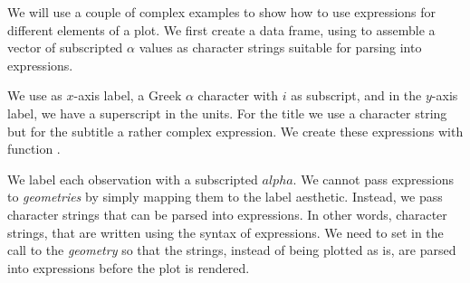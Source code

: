 \documentclass[krantz2]{krantz}\usepackage{knitr}
\begin{document}
We will use a couple of complex examples to show how to use expressions for different elements of a plot.
We first create a data frame, using  to assemble a vector of subscripted $\alpha$ values as character strings suitable for parsing into expressions.

\begin{knitrout}\footnotesize
{}\color{fgcolor}\begin{kframe}
\begin{alltt}
\hlstd{(}\hlstd{)} 
 \hlkwb{<-}
  \hlstd{(} \hlstd{=} \hlopt{:}\hlstd{,}
              \hlstd{=} \hlstd{(}\hlstd{),}
              \hlstd{=} \hlstd{(}\hlstr{"alpha["}\hlstd{,} \hlopt{:}\hlstd{,} \hlstr{"]"}\hlstd{,}  \hlstd{=} \hlstd{))}
\end{alltt}
\end{kframe}
\end{knitrout}

We use as $x$-axis label, a Greek $\alpha$ character with $i$ as subscript, and in the $y$-axis label, we have a superscript in the units. For the title we use a character string but for the subtitle a rather complex expression. We create these expressions with function .

We label each observation with a subscripted $alpha$. We cannot pass expressions to \emph{geometries} by simply mapping them to the label aesthetic. Instead, we pass character strings that can be parsed into expressions. In other words, character strings, that are written using the syntax of expressions. We need to set  in the call to the \emph{geometry} so that the strings, instead of being plotted as is, are parsed into expressions before the plot is rendered.
\end{document}
